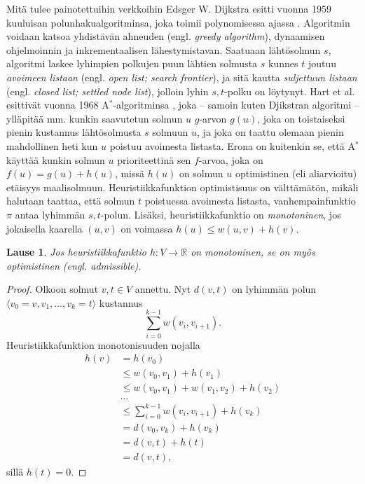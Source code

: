 \documentclass[finnish]{tktltiki2}
\newtheorem{lau}{Lause}
\theoremstyle{definition}
\theoremstyle{remark}
\begin{document}
Mitä tulee painotettuihin verkkoihin Edsger W. Dijkstra esitti vuonna 1959 kuuluisan polunhakualgoritminsa, joka toimii polynomisessa ajassa \cite{Dijkstra59}. Algoritmin voidaan katsoa yhdistävän ahneuden (engl. \textit{greedy algorithm}), dynaamisen ohjelmoinnin ja inkrementaalisen lähestymistavan. Saatuaan lähtösolmun $s$, algoritmi laskee lyhimpien polkujen puun lähtien solmusta $s$ kunnes $t$ joutuu \textit{avoimeen listaan} (engl. \textit{open list; search frontier}), ja sitä kautta \textit{suljettuun listaan} (engl. \textit{closed list; settled node list}), jolloin lyhin $s, t$-polku on löytynyt. Hart et al. esittivät vuonna 1968 A$^{\ast}$-algoritminsa \cite{Hart68},  joka -- samoin kuten Djikstran algoritmi -- ylläpitää mm. kunkin saavutetun solmun $u$ $g$-arvon $g(u)$, joka on toistaiseksi pienin kustannus lähtösolmusta $s$ solmuun $u$, ja joka on taattu olemaan pienin mahdollinen heti kun $u$ poistuu avoimesta listasta. Erona on kuitenkin se, että A$^{\ast}$ käyttää kunkin solmun $u$ prioriteettinä sen $f$-arvoa, joka on $f(u) = g(u) + h(u)$, missä $h(u)$ on solmun $u$ optimistinen (eli aliarvioitu) etäisyys maalisolmuun. Heuristiikkafunktion optimistisuus on välttämätön, mikäli halutaan taattaa, että solmun $t$ poistuessa avoimesta listasta, vanhempainfunktio $\pi$ antaa lyhimmän $s,t$-polun. Lisäksi, heuristiikkafunktio on \textit{monotoninen}, jos jokaisella kaarella $(u, v)$ on voimassa $h(u) \leq w(u, v) + h(v)$.
\begin{lau}
Jos heuristiikkafunktio $h \colon V \to \mathbb{R}$ on monotoninen, se on myös optimistinen (engl. \textit{admissible}).
\end{lau}
\begin{proof}
Olkoon solmut $v, t \in V$ annettu. Nyt $d(v, t)$ on lyhimmän polun $\langle v_0 = v, v_1, \dots, v_k = t \rangle$ kustannus 
\[
\sum_{i = 0}^{k - 1} w(v_i, v_{i + 1}).
\]
Heuristiikkafunktion monotonisuuden nojalla
\begin{align*}
h(v) &= h(v_0) \\
          &\leq w(v_0, v_1) + h(v_1) \\
          &\leq w(v_0, v_1) + w(v_1, v_2) + h(v_2) \\
          &\dots \\
          &\leq \sum_{i = 0}^{k - 1} w(v_i, v_{i + 1}) + h(v_k) \\
          &= d(v_0, v_k) + h(v_k) \\
          &= d(v, t) + h(t) \\
          &= d(v, t),
\end{align*}
sillä $h(t) = 0$.
\end{proof}
\end{document}
